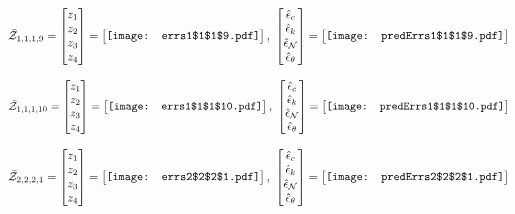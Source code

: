 \documentclass[12pt]{article}
\begin{document}
\begin{gather*}
\bar{\mathcal{Z}}_{1,1,1,9}=\begin{bmatrix}
z_1\\
z_2\\
z_3\\
z_4
 \end{bmatrix}= \begin{bmatrix}
\vcenter{\hbox{\texttt{[image: errs1\$1\$1\$9.pdf]}}}
 \end{bmatrix},\,\, \begin{bmatrix}
\hat{\epsilon}_c\\\hat{\epsilon}_k\\\hat{\epsilon}_\mathcal{N}\\\hat{\epsilon}_\theta
 \end{bmatrix}=\begin{bmatrix}
\vcenter{\hbox{\texttt{[image: predErrs1\$1\$1\$9.pdf]}}}
 \end{bmatrix}
\end{gather*}

\begin{gather*}
\bar{\mathcal{Z}}_{1,1,1,10}=\begin{bmatrix}
z_1\\
z_2\\
z_3\\
z_4
 \end{bmatrix}= \begin{bmatrix}
\vcenter{\hbox{\texttt{[image: errs1\$1\$1\$10.pdf]}}}
 \end{bmatrix},\,\, \begin{bmatrix}
\hat{\epsilon}_c\\\hat{\epsilon}_k\\\hat{\epsilon}_\mathcal{N}\\\hat{\epsilon}_\theta
 \end{bmatrix}=\begin{bmatrix}
\vcenter{\hbox{\texttt{[image: predErrs1\$1\$1\$10.pdf]}}}
 \end{bmatrix}
\end{gather*}


\begin{gather*}
\bar{\mathcal{Z}}_{2,2,2,1}=\begin{bmatrix}
z_1\\
z_2\\
z_3\\
z_4
 \end{bmatrix}= \begin{bmatrix}
\vcenter{\hbox{\texttt{[image: errs2\$2\$2\$1.pdf]}}}
 \end{bmatrix},\,\, \begin{bmatrix}
\hat{\epsilon}_c\\\hat{\epsilon}_k\\\hat{\epsilon}_\mathcal{N}\\\hat{\epsilon}_\theta
 \end{bmatrix}=\begin{bmatrix}
\vcenter{\hbox{\texttt{[image: predErrs2\$2\$2\$1.pdf]}}}
 \end{bmatrix}
\end{gather*}
\end{document}
